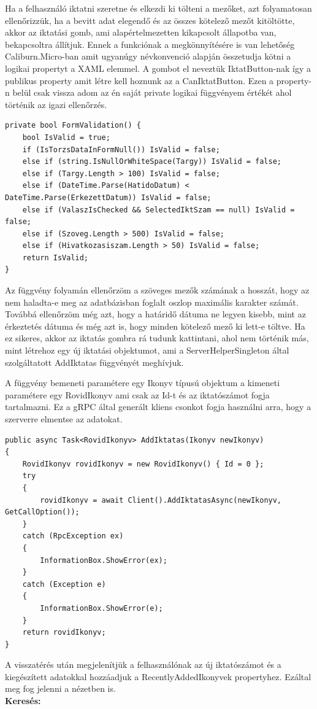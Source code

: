 \documentclass[
]{thesis-ekf}
\theoremstyle{definition}
\theoremstyle{remark}
\begin{document}
Ha a felhasználó iktatni szeretne és elkezdi ki tölteni a mezőket, azt folyamatosan ellenőrizzük, ha a bevitt adat elegendő és az összes kötelező mezőt kitöltötte, akkor az iktatási gomb, ami alapértelmezetten kikapcsolt állapotba van, bekapcsoltra állítjuk. Ennek a funkciónak a megkönnyítésére is van lehetőség Caliburn.Micro-ban amit ugyanúgy névkonvenció alapján összetudja kötni a logikai propertyt a XAML elemmel. A gombot el neveztük IktatButton-nak így a publikus property amit létre kell hoznunk az a CanIktatButton.
Ezen a property-n belül csak vissza adom az én saját private logikai függvényem értékét ahol történik az igazi ellenőrzés. 
\begin{lstlisting}
private bool FormValidation() {
	bool IsValid = true;
	if (IsTorzsDataInFormNull()) IsValid = false;
	else if (string.IsNullOrWhiteSpace(Targy)) IsValid = false;
	else if (Targy.Length > 100) IsValid = false;
	else if (DateTime.Parse(HatidoDatum) < DateTime.Parse(ErkezettDatum)) IsValid = false;
	else if (ValaszIsChecked && SelectedIktSzam == null) IsValid = false;
	else if (Szoveg.Length > 500) IsValid = false;
	else if (Hivatkozasiszam.Length > 50) IsValid = false;
	return IsValid;
}
\end{lstlisting}
Az függvény folyamán ellenőrzöm a szöveges mezők számának a hosszát, hogy az nem haladta-e meg az adatbázisban foglalt oszlop maximális karakter számát. Továbbá ellenőrzöm még azt, hogy a határidő dátuma ne legyen kisebb, mint az érkeztetés dátuma és még azt is, hogy minden kötelező mező ki lett-e töltve. Ha ez sikeres, akkor az iktatás gombra rá tudunk kattintani, ahol nem történik más, mint létrehoz egy új iktatási objektumot, ami a ServerHelperSingleton által szolgáltatott AddIktatas függvényét meghívjuk. 

A függvény bemeneti paramétere egy Ikonyv típusú objektum a kimeneti paramétere egy RovidIkonyv ami csak az Id-t és az iktatószámot fogja tartalmazni. Ez a gRPC által generált kliens csonkot fogja használni arra, hogy a szerverre elmentse az adatokat. 
\begin{lstlisting}
public async Task<RovidIkonyv> AddIktatas(Ikonyv newIkonyv)
{
	RovidIkonyv rovidIkonyv = new RovidIkonyv() { Id = 0 };
	try
	{
		rovidIkonyv = await Client().AddIktatasAsync(newIkonyv, GetCallOption());
	}
	catch (RpcException ex)
	{
		InformationBox.ShowError(ex);
	}
	catch (Exception e)
	{
		InformationBox.ShowError(e);
	}
	return rovidIkonyv;
}

\end{lstlisting}
A visszatérés után megjelenítjük a felhasználónak az új iktatószámot és a kiegészített adatokkal hozzáadjuk a RecentlyAddedIkonyvek propertyhez. Ezáltal meg fog jelenni a nézetben is.\\
\textbf{Keresés:}
\end{document}

